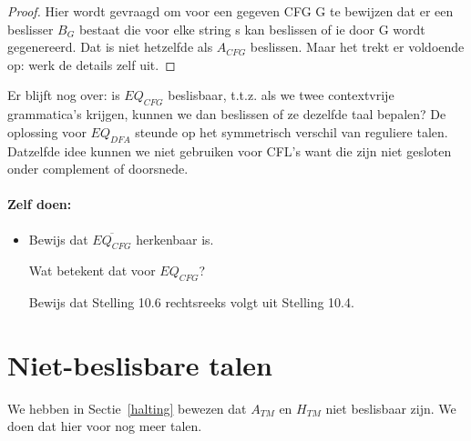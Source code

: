 \begin{proof}
Hier wordt gevraagd om voor een gegeven CFG G te bewijzen dat er een
beslisser $B_G$ bestaat die voor elke string s kan beslissen of ie
door G wordt gegenereerd. Dat is niet hetzelfde als $A_{CFG}$
beslissen. Maar het trekt er voldoende op: werk de details zelf uit.
\end{proof} 

Er blijft nog over: is $EQ_{CFG}$ beslisbaar, t.t.z. als we twee
contextvrije grammatica's krijgen, kunnen we dan beslissen of ze
dezelfde taal bepalen? De oplossing voor $EQ_{DFA}$ steunde op het
symmetrisch verschil van reguliere talen. Datzelfde idee kunnen we
niet gebruiken voor CFL's want die zijn niet gesloten onder
complement of doorsnede. 

\paragraph{Zelf doen:}
\begin{itemize}
\item[]
Bewijs dat $\overline{EQ_{CFG}}$ herkenbaar is.

Wat betekent dat voor $EQ_{CFG}$?

Bewijs dat Stelling 10.6 rechtsreeks volgt uit Stelling 10.4.
\end{itemize}



\section{Niet-beslisbare talen}

We hebben in Sectie~\ref{halting} bewezen dat $A_{TM}$ en $H_{TM}$
niet beslisbaar zijn. We doen dat hier voor nog meer talen.

